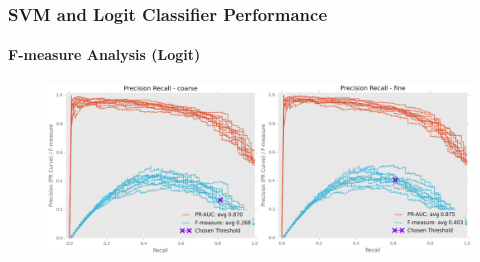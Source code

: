 \documentclass{beamer}
\begin{document}
\begin{frame}
    \frametitle{SVM and Logit Classifier Performance}  %
    \framesubtitle{F-measure Analysis (Logit)}
    \begin{figure}[!htb]
    \centering
        \includegraphics[width=1.0\columnwidth]{fig/precRec}
    \label{fig:precRec}
    \end{figure}

\end{frame}
\end{document}
